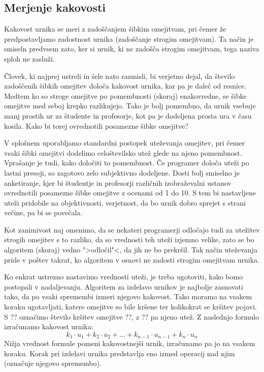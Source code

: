 \documentclass[a4paper, 10pt]{article}
\begin{document}
\subsection{Merjenje kakovosti }%

Kakovost urnika se meri z zadoščanjem šibkim omejitvam, pri čemer že predpostavljamo
zadostnost urnika (zadoščanje strogim omejitvam). Ta način je smiseln predvsem zato,
ker si urnik, ki ne zadošča strogim omejitvam, tega naziva sploh ne zasluži.

Človek, ki najprej ustreli in šele nato razmisli, bi verjetno dejal, da število
zadoščenih šibkih omejitev določa kakovost urnika, kar pa je daleč od resnice. Medtem
ko so stroge omejitve po pomembnosti (skoraj) enakovredne, se šibke omejitve med seboj
krepko razlikujejo. Tako je bolj pomembno, da urnik vsebuje manj prostih ur za
študente in profesorje, kot pa je dodeljena prosta ura v času kosila. Kako bi torej
ovrednotili posamezne šibke omejitve?

V splošnem uporabljamo standardni postopek uteževanja omejitev, pri čemer vsaki šibki
omejitvi dodelimo celoštevilsko utež glede na njeno pomembnost. Vprašanje je tudi, kako
določiti to pomembnost. Če programer določa uteži po lastni presoji, so zagotovo zelo
subjektivno dodeljene. Dosti bolj smiselno je anketiranje, kjer bi študentje in profesorji
različnih izobraževalni ustanov ovrednotili posamezne šibke omejitve z ocenami od 1 do 10.
S tem bi nastavljene uteži pridobile na objektivnosti, verjetnost, da bo urnik dobro
sprejet s strani večine, pa bi se povečala.

Kot zanimivost naj omenimo, da se nekateri programerji odločajo tudi za utežitev strogih
omejitev s to razliko, da so vrednosti teh uteži izjemno velike, zato se bo algoritem
(skoraj) vedno ">odločil"<, da jih ne bo prekršil. Tak način uteževanja pride v poštev
takrat, ko algoritem v osnovi ne zadosti strogim omejitvam urnika.

Ko enkrat ustrezno nastavimo vrednosti uteži, je treba ugotoviti, kako bomo postopali
v nadaljevanju. Algoritem za izdelavo urnikov je najbolje zasnovati tako, da po vsaki
spremembi izmeri njegovo kakovost. Tako moramo na vsakem koraku ugotavljati, katere
omejitve so bile kršene ter kolikokrat se kršitev pojavi. S ?? označimo število
kršitev omejitve ??, z ?? pa njeno utež. Z naslednjo formulo izračunamo
kakovost urnika:
\[k_1 \cdot u_1 + k_2 \cdot u_2 + ... + k_{n-1} \cdot u_{n-1} + k_n \cdot u_n \]
Nižja vrednost formule pomeni kakovostnejši urnik, izračunamo pa jo na vsakem koraku.
Korak pri izdelavi urnika predstavlja eno izmed operacij nad njim (označuje njegovo
spremembo).
\end{document}
